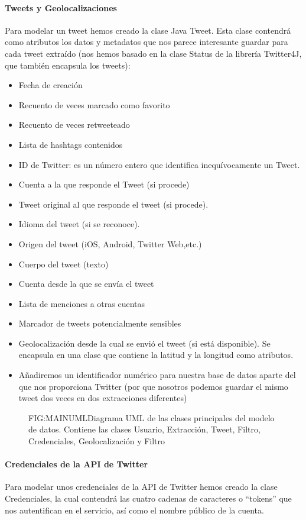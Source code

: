 \paragraph{Tweets y Geolocalizaciones}
Para modelar un tweet hemos creado la clase Java Tweet. Esta clase contendrá como atributos los datos y metadatos que nos parece interesante guardar para cada tweet extraído (nos hemos basado en la clase Status de la librería Twitter4J, que también encapsula los tweets):
\begin{itemize}
	\item Fecha de creación
	\item Recuento de veces marcado como favorito
	\item Recuento de veces retweeteado
	\item Lista de hashtags contenidos
	\item ID de Twitter: es un número entero que identifica inequívocamente un Tweet.
	\item Cuenta a la que responde el Tweet (si procede)
	\item Tweet original al que responde el tweet (si procede).
	\item Idioma del tweet (si se reconoce).
	\item Origen del tweet (iOS, Android, Twitter Web,etc.)
	\item Cuerpo del tweet (texto)
	\item Cuenta desde la que se envía el tweet
	\item Lista de menciones a otras cuentas
	\item Marcador de tweets potencialmente sensibles
	\item Geolocalización desde la cual se envió el tweet (si está disponible). Se encapsula en una clase que contiene la latitud y la longitud como atributos.
	\item Añadiremos un identificador numérico para nuestra base de datos aparte del que nos proporciona Twitter (por que nosotros podemos guardar el mismo tweet dos veces en dos extracciones diferentes)
\end{itemize}

\begin{figure}[Diagrama UML Principal]{FIG:MAINUML}{Diagrama UML de las clases principales del modelo de datos. Contiene las clases Usuario, Extracción, Tweet, Filtro, Credenciales, Geolocalización y Filtro}
\end{figure}
\paragraph{Credenciales de la API de Twitter}
Para modelar unos credenciales de la API de Twitter hemos creado la clase Credenciales, la cual contendrá las cuatro cadenas de caracteres o ``tokens'' que nos autentifican en el servicio, así como el nombre público de la cuenta. 
